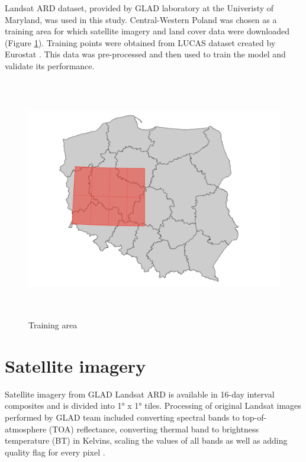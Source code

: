\documentclass{amuthesis}
\begin{document}
Landsat ARD dataset, provided by GLAD laboratory at the Univeristy of
Maryland, was used in this study. Central-Western Poland was chosen as a
training area for which satellite imagery and land cover data were
downloaded (Figure \ref{fig-rycina1}). Training points were obtained
from LUCAS dataset created by Eurostat \autocite{dandrimont2020}. This
data was pre-processed and then used to train the model and validate its
performance.

\begin{figure}[t]

{\centering \includegraphics[width=1\textwidth,height=4.16667in]{./figures/study_area.png}

}

\caption{\label{fig-rycina1}Training area}

\end{figure}

\hypertarget{sec-sat}{%
\section{Satellite imagery}\label{sec-sat}}

Satellite imagery from GLAD Landsat ARD is available in 16-day interval
composites and is divided into 1° x 1° tiles. Processing of original
Landsat images performed by GLAD team included converting spectral bands
to top-of-atmosphere (TOA) reflectance, converting thermal band to
brightness temperature (BT) in Kelvins, scaling the values of all bands
as well as adding quality flag for every pixel \autocite{potapov2020}.
\end{document}
